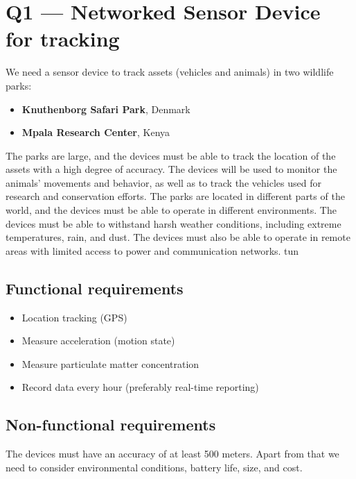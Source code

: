 \section{Q1 --- Networked Sensor Device for tracking}

We need a sensor device to track assets (vehicles and animals) in two wildlife parks:

\begin{itemize}
  \item \textbf{Knuthenborg Safari Park}, Denmark
  \item \textbf{Mpala Research Center}, Kenya
\end{itemize}

The parks are large, and the devices must be able to track the location of the assets with a high degree of accuracy. The devices will be used to monitor the animals' movements and behavior, as well as to track the vehicles used for research and conservation efforts.
The parks are located in different parts of the world, and the devices must be able to operate in different environments. The devices must be able to withstand harsh weather conditions, including extreme temperatures, rain, and dust. The devices must also be able to operate in remote areas with limited access to power and communication networks.  tun

\subsection{Functional requirements}

\begin{itemize}
  \item Location tracking (GPS)
  \item Measure acceleration (motion state)
  \item Measure particulate matter concentration
  \item Record data every hour (preferably real-time reporting)
\end{itemize}

\subsection{Non-functional requirements}
The devices must have an accuracy of at least 500 meters. Apart from that we need to consider environmental conditions, battery life, size, and cost.

